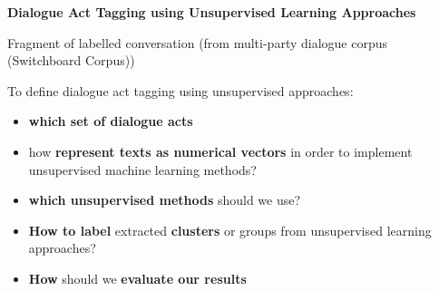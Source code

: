 \documentclass{beamer}
\begin{document}
\begin{frame}
\begin{center}
\textbf{Dialogue Act Tagging using Unsupervised Learning Approaches}
\end{center}
\end{frame}

\begin{frame}{Fragment of labelled conversation (from multi-party dialogue corpus (Switchboard Corpus))}


\begin{center}
\end{center}

\end{frame}
\begin{frame}
To define dialogue act tagging using unsupervised approaches:
\begin{itemize}
 \item \textbf{which set of dialogue acts}
 \item how \textbf{represent texts as numerical vectors} in order to implement unsupervised machine learning methods?
\item \textbf{which unsupervised methods }should we use?
\item \textbf{How to label }extracted \textbf{clusters }or groups from unsupervised learning approaches?
\item \textbf{How }should we \textbf{evaluate our results} 
\end{itemize}

\end{frame}
\end{document}
